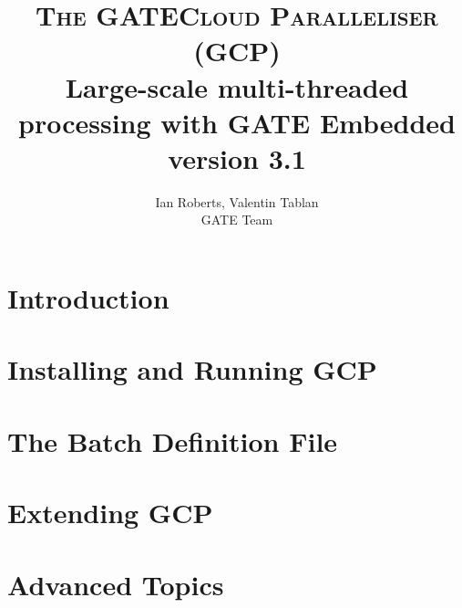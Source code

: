 \documentclass[10pt, a4paper, twoside]{report}
\begin{document}
\title{{\Huge {\textsc{The GATECloud Paralleliser (GCP)}}}\\
Large-scale multi-threaded processing with GATE Embedded \\
{\small version 3.1}
}
\author{Ian Roberts, Valentin Tablan\\GATE Team}

\thispagestyle{empty}
\maketitle


\clearpage

\setcounter{tocdepth}{2}
\tableofcontents

\thispagestyle{empty}
\cleardoublepage

\pagestyle{fancy}
\fancyhead{} %

\chapter{Introduction}\label{chap:intro}


\chapter{Installing and Running GCP}\label{chap:install}


\chapter{The Batch Definition File}\label{chap:batch-def}


\chapter{Extending GCP}\label{chap:extending}


\chapter{Advanced Topics}\label{chap:advanced}

\end{document}
